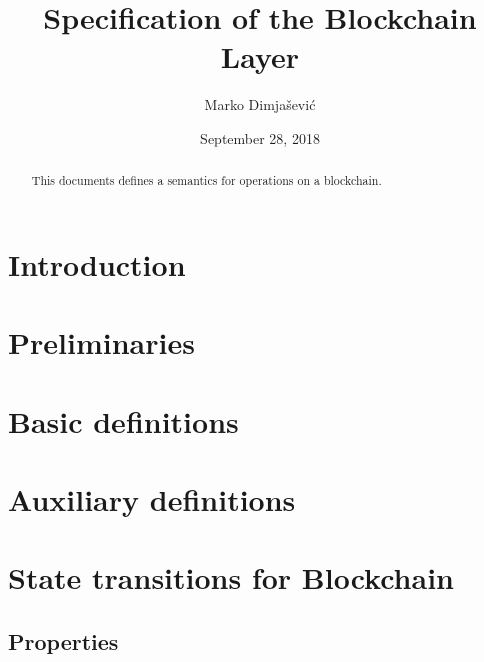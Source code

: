\documentclass[11pt,a4paper]{article}
\begin{document}
\title{Specification of the Blockchain Layer}

\author{Marko Dimjašević}

\date{September 28, 2018}

\maketitle

\begin{abstract}
This documents defines a semantics for operations on a blockchain.
\end{abstract}

\tableofcontents
\listoffigures

\section{Introduction}
\label{sec:introduction}

\section{Preliminaries}
\label{sec:preliminaries}

\section{Basic definitions}
\label{sec:basic-definitions}

\section{Auxiliary definitions}
\label{sec:auxil-defin}

\section{State transitions for Blockchain}
\label{sec:state-trans-chain}

\subsection{Properties}
\label{sec:chain-properties}
\end{document}
